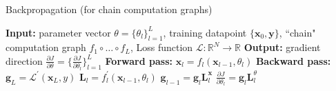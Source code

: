 

\newcommand{\xin}{\mathbf{x}_{\texttt{in}}}
\newcommand{\xout}{\mathbf{x}_{\texttt{out}}}
\newcommand{\xint}{\mathbf{x}_{\texttt{in}_t}}
\newcommand{\xoutt}{\mathbf{x}_{\texttt{out}_t}}
\newcommand{\localgrad}{\mathbf{L}}
\newcommand{\localgradx}{\mathbf{L}^{\mathbf{x}}}
\newcommand{\localgradtheta}{\mathbf{L}^{\theta}}
\newcommand{\costgrad}{\mathbf{g}}
\newcommand{\costgradxin}{\mathbf{g}^{\xin}}
\newcommand{\costgradxout}{\mathbf{g}^{\xout}}
\newcommand{\costgradin}{\mathbf{g}_{\texttt{in}}}
\newcommand{\costgradout}{\mathbf{g}_{\texttt{out}}}
\newcommand{\costgradtheta}{\mathbf{g}^{\theta}}
\newcommand{\costgradl}{\mathbf{g}_l}


\begin{algorithm}[h]
\label{gradient_descent}
\SetAlgoVlined
\DontPrintSemicolon
\caption{Backpropagation (for chain computation graphs)}
{\bf Input:} parameter vector $\theta = \{\theta_l\}_{l=1}^L$, training datapoint $\{\mathbf{x}_0,\mathbf{y}\}$, ``chain" computation graph $f_1 \circ \ldots \circ f_L$, Loss function $\mathcal{L}: \mathbb{R}^N \rightarrow \mathbb{R}$\;
{\bf Output:} gradient direction $\frac{\partial J}{\partial \theta} = \{\frac{\partial J}{\partial \theta_l}\}_{l=1}^L$ \;
\;
\textbf{Forward pass:}\;
 {
    $\mathbf{x}_l = f_l(\mathbf{x}_{l-1}, \theta_l)$\;
}
\;
\textbf{Backward pass:}\;
$\costgrad_L = \mathcal{L}^{\prime}(\mathbf{x}_L,y)$\;
 {
    $\localgrad_{l} = f_l^{\prime}(\mathbf{x}_{l-1},\theta_l)$\;
    $\costgrad_{l-1} = \costgrad_{l}\localgrad^{\mathbf{x}}_{l}$\;
    $\frac{\partial J}{\partial \theta_l} = \costgrad_{l}\localgrad^{\theta}_{l}$\;
}
\label{alg:backpropagation:backprop_for_chains}
\end{algorithm}
